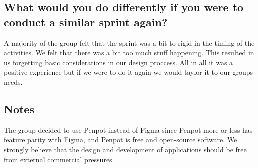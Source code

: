 \documentclass[12pt]{article}
\begin{document}
\subsection{What would you do differently if you were to conduct a similar sprint again?}
A majority of the group felt that the sprint was a bit to rigid in the timing of the activities.
We felt that there was a bit too much stuff happening. This resulted in us forgetting
basic considerations in our design proccess. All in all it was a positive experience
but if we were to do it again we would taylor it to our groups needs.

\subsection{Notes}
The group decided to use Penpot\cite{PenpotDesignTool} instead of Figma\cite{FigmaCollaborativeInterface} since Penpot more or less has feature parity with Figma, 
and Penpot is free and open-source software. We strongly believe that the design and development of applications should be free from external commercial pressures.
\printbibliography
\end{document}

